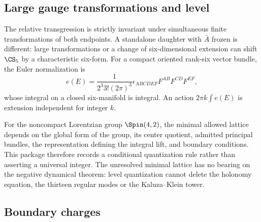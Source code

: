 \subsection{Large gauge transformations and level}

The relative transgression is strictly invariant under simultaneous finite transformations of both endpoints.  A standalone daughter with $\bar A$ frozen is different: large transformations or a change of six-dimensional extension can shift $\CS_5$ by a characteristic six-form.  For a compact oriented rank-six vector bundle, the Euler normalization is
\[
e(E)=\frac{1}{2^3 3!(2\pi)^3}
\epsilon_{ABCDEF}F^{AB}F^{CD}F^{EF},
\]
whose integral on a closed six-manifold is integral.  An action $2\pi k\int e(E)$ is extension independent for integer $k$.

For the noncompact Lorentzian group $\Spin(4,2)$, the minimal allowed lattice depends on the global form of the group, its center quotient, admitted principal bundles, the representation defining the integral lift, and boundary conditions.  This package therefore records a conditional quantization rule rather than asserting a universal integer.  The unresolved minimal lattice has no bearing on the negative dynamical theorem: level quantization cannot delete the holonomy equation, the thirteen regular modes or the Kaluza--Klein tower.

\subsection{Boundary charges}

